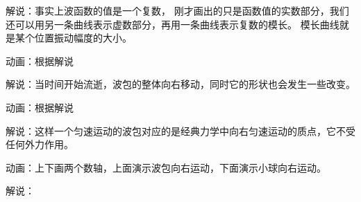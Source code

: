 解说：事实上波函数的值是一个复数， 刚才画出的只是函数值的实数部分，我们还可以用另一条曲线表示虚数部分，再用一条曲线表示复数的模长。 模长曲线就是某个位置振动幅度的大小。

动画：根据解说

解说：当时间开始流逝，波包的整体向右移动，同时它的形状也会发生一些改变。

动画：根据解说

解说：这样一个匀速运动的波包对应的是经典力学中向右匀速运动的质点，它不受任何外力作用。

动画：上下画两个数轴，上面演示波包向右运动，下面演示小球向右运动。

解说：






